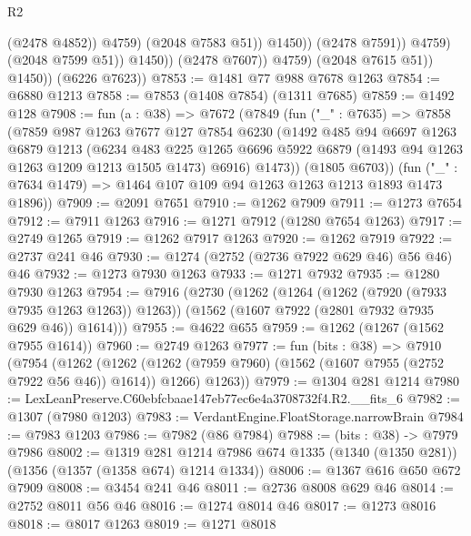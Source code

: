 \begin{lexlean}{R2}
\begin{coremodule}
                                    (@2478 @4852))
                                  @4759)
                                (@2048 @7583 @51))
                              @1450))
                          (@2478 @7591))
                        @4759)
                      (@2048 @7599 @51))
                    @1450))
                (@2478 @7607))
              @4759)
            (@2048 @7615 @51))
          @1450))
      (@6226 @7623))
@7853 := @1481 @77 @988 @7678 @1263
@7854 := @6880 @1213
@7858 := @7853 (@1408 @7854) (@1311 @7685)
@7859 := @1492 @128
@7908 := fun (a : @38) =>
  @7672
    (@7849
      (fun ("_" : @7635) =>
      @7858
        (@7859
          @987
          @1263
          @7677
          @127
          @7854
          @6230
          (@1492
            @485
            @94
            @6697
            @1263
            @6879
            @1213
            (@6234
              @483
              @225
              @1265
              @6696
              @5922
              @6879
              (@1493 @94 @1263 @1263 @1209 @1213 @1505 @1473)
              @6916)
            @1473))
        (@1805 @6703))
      (fun ("_" : @7634 @1479) => @1464 @107 @109 @94 @1263 @1263 @1213 @1893 @1473 @1896))
@7909 := @2091 @7651
@7910 := @1262 @7909
@7911 := @1273 @7654
@7912 := @7911 @1263
@7916 := @1271 @7912 (@1280 @7654 @1263)
@7917 := @2749 @1265
@7919 := @1262 @7917 @1263
@7920 := @1262 @7919
@7922 := @2737 @241 @46
@7930 := @1274 (@2752 (@2736 @7922 @629 @46) @56 @46) @46
@7932 := @1273 @7930 @1263
@7933 := @1271 @7932
@7935 := @1280 @7930 @1263
@7954 := @7916
    (@2730
      (@1262
        (@1264 (@1262 (@7920 (@7933 @7935 @1263 @1263)) @1263))
        (@1562 (@1607 @7922 (@2801 @7932 @7935 @629 @46)) @1614)))
@7955 := @4622 @655
@7959 := @1262 (@1267 (@1562 @7955 @1614))
@7960 := @2749 @1263
@7977 := fun (bits : @38) =>
  @7910
    (@7954
      (@1262
        (@1262 (@1262 (@7959 @7960) (@1562 (@1607 @7955 (@2752 @7922 @56 @46)) @1614)) @1266)
        @1263))
@7979 := @1304 @281 @1214
@7980 := LexLeanPreserve.C60ebfcbaae147eb77ec6e4a3708732f4.R2.__fits_6
@7982 := @1307 (@7980 @1203)
@7983 := VerdantEngine.FloatStorage.narrowBrain
@7984 := @7983 @1203
@7986 := @7982 (@86 @7984)
@7988 := (bits : @38) -> @7979 @7986
@8002 := @1319
    @281
    @1214
    @7986
    @674
    @1335
    (@1340 (@1350 @281))
    (@1356 (@1357 (@1358 @674) @1214 @1334))
@8006 := @1367 @616 @650 @672 @7909
@8008 := @3454 @241 @46
@8011 := @2736 @8008 @629 @46
@8014 := @2752 @8011 @56 @46
@8016 := @1274 @8014 @46
@8017 := @1273 @8016
@8018 := @8017 @1263
@8019 := @1271 @8018

\end{coremodule}
\end{lexlean}
